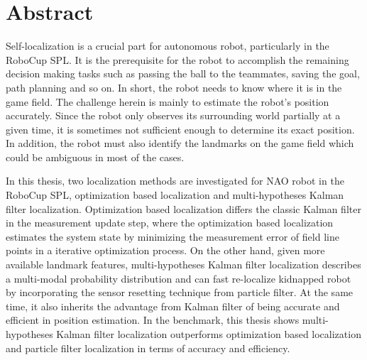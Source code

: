 \thispagestyle{empty}
\chapter*{Abstract}

Self-localization is a crucial part for autonomous robot, particularly in the RoboCup \gls{SPL}. It is the prerequisite for the robot to accomplish the remaining decision making tasks such as passing the ball to the teammates, saving the goal, path planning and so on. In short, the robot needs to know where it is in the game field. The challenge herein is mainly to estimate the robot's position accurately. Since the robot only observes its surrounding world partially at a given time, it is sometimes not sufficient enough to determine its exact position. In addition, the robot must also identify the landmarks on the game field which could be ambiguous in most of the cases. 

In this thesis, two localization methods are investigated for NAO robot in the RoboCup \gls{SPL}, \ie{} optimization based localization and multi-hypotheses Kalman filter localization.
Optimization based localization differs the classic Kalman filter in the measurement update step, where the optimization based localization estimates the system state by minimizing the measurement error of field line points in a iterative optimization process. 
On the other hand, given more available landmark features, multi-hypotheses Kalman filter localization describes a multi-modal probability distribution and can fast re-localize kidnapped robot by incorporating the sensor resetting technique from particle filter. At the same time, it also inherits the advantage from Kalman filter of being accurate and efficient in position estimation. In the benchmark, this thesis shows multi-hypotheses Kalman filter localization outperforms optimization based localization and particle filter localization in terms of accuracy and efficiency.
